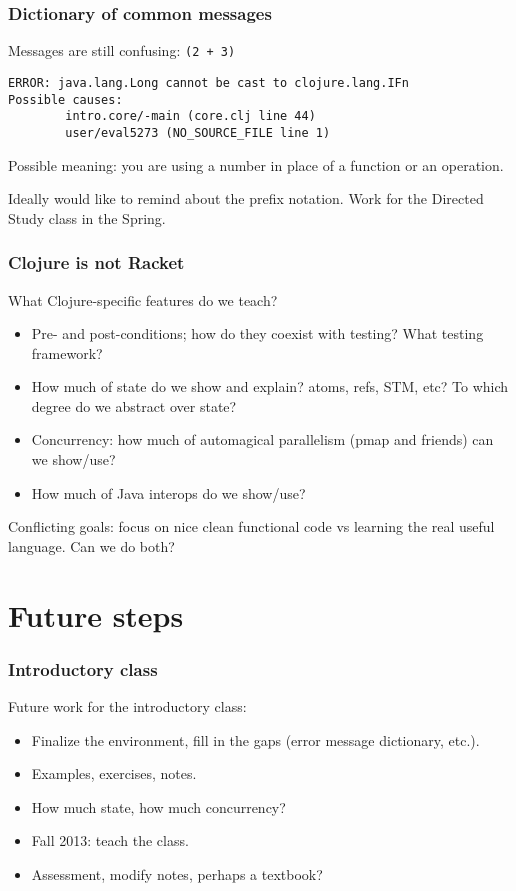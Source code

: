 \documentclass{beamer}
\begin{document}
\begin{frame}[fragile]
  \frametitle{Dictionary of common messages}
Messages are still confusing: {\tt (2 + 3)}
\begin{verbatim} 
ERROR: java.lang.Long cannot be cast to clojure.lang.IFn
Possible causes:
        intro.core/-main (core.clj line 44)
        user/eval5273 (NO_SOURCE_FILE line 1)
\end{verbatim}
Possible meaning: you are using a number in place of a function or an operation. 

Ideally would like to remind about the prefix notation. Work for the Directed Study class in the Spring. 
\end{frame}



\begin{frame}
  \frametitle{Clojure is not Racket}
What Clojure-specific features do we teach? 
\begin{itemize}
\item Pre- and post-conditions; how do they coexist with testing? What testing framework?
\item How much of state do we show and explain? atoms, refs, STM, etc? To which degree do we abstract over state? 
\item Concurrency: how much of automagical parallelism (pmap and friends) can we show/use? 
\item How much of Java interops do we show/use?
\end{itemize}
Conflicting goals: focus on nice clean functional code vs learning the real useful language. Can we do both? 
\end{frame}


\section{Future steps}

\begin{frame}
  \frametitle{Introductory class}
Future work for the introductory class:
\begin{itemize}
\item Finalize the environment, fill in the gaps (error message dictionary, etc.).
\item Examples, exercises, notes. 
\item How much state, how much concurrency?
\item Fall 2013: teach the class.
\item Assessment, modify notes, perhaps a textbook?
\end{itemize}
\end{frame}
\end{document}
